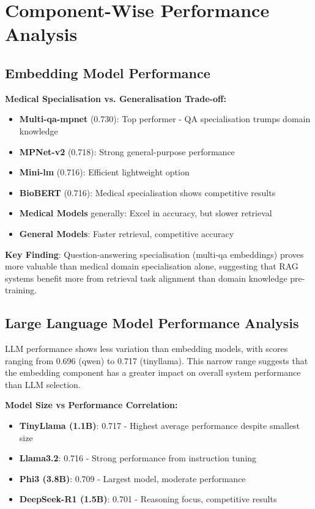 \section{Component-Wise Performance Analysis}

\subsection{Embedding Model Performance}


\textbf{Medical Specialisation vs. Generalisation Trade-off:}
\begin{itemize}
    \item \textbf{Multi-qa-mpnet} (0.730): Top performer - QA specialisation trumps domain knowledge
    \item \textbf{MPNet-v2} (0.718): Strong general-purpose performance
    \item \textbf{Mini-lm} (0.716): Efficient lightweight option
    \item \textbf{BioBERT} (0.716): Medical specialisation shows competitive results
    \item \textbf{Medical Models} generally: Excel in accuracy, but slower retrieval
    \item \textbf{General Models}: Faster retrieval, competitive accuracy
\end{itemize}

\textbf{Key Finding}: Question-answering specialisation (multi-qa embeddings) proves more valuable than medical domain specialisation alone, suggesting that RAG systems benefit more from retrieval task alignment than domain knowledge pre-training.

\subsection{Large Language Model Performance Analysis}

LLM performance shows less variation than embedding models, with scores ranging from 0.696 (qwen) to 0.717 (tinyllama). This narrow range suggests that the embedding component has a greater impact on overall system performance than LLM selection.

\textbf{Model Size vs Performance Correlation:}
\begin{itemize}
    \item \textbf{TinyLlama (1.1B)}: 0.717 - Highest average performance despite smallest size
    \item \textbf{Llama3.2}: 0.716 - Strong performance from instruction tuning
    \item \textbf{Phi3 (3.8B)}: 0.709 - Largest model, moderate performance
    \item \textbf{DeepSeek-R1 (1.5B)}: 0.701 - Reasoning focus, competitive results
\end{itemize}

